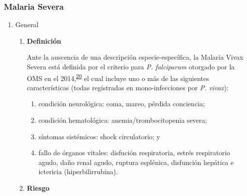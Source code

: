 \documentclass[]{article}
\providecommand{\tightlist}{%
  \setlength{\itemsep}{0pt}\setlength{\parskip}{0pt}}
\begin{document}
\subsubsection{Malaria Severa}\label{malaria-severa}

\begin{enumerate}
\def\labelenumi{\alph{enumi}.}
\item
  General

  \begin{enumerate}
  \def\labelenumii{\roman{enumii}.}
  \item
    \textbf{Definición}

    Ante la auscencia de una descripción especie-específica, la Malaria
    Vivax Severa está definida por el criterio para \emph{P. falciparum}
    otorgado por la OMS en el
    2014,\textsuperscript{\protect\hyperlink{ref-WHO2014severe}{20}} el
    cual incluye uno o más de las siguientes características (todas
    registradas en mono-infecciones por \emph{P. vivax}):

    \begin{enumerate}
    \def\labelenumiii{\arabic{enumiii}.}
    \tightlist
    \item
      condición neurológica: coma, mareo, pérdida conciencia;
    \item
      condición hematológica: anemia/trombocitopenia severa;
    \item
      síntomas sistémicos: shock circulatorio; y
    \item
      fallo de órganos vitales: disfución respiratoria, estrés
      respiratorio agudo, daño renal agudo, ruptura esplénica,
      disfunción hepática e ictericia (hiperbilirrubina).
    \end{enumerate}
  \item
    \textbf{Riesgo}


\end{enumerate}
\end{enumerate}
\end{document}
